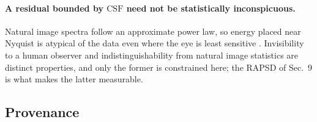 \paragraph{A residual bounded by $\mathrm{CSF}$ need not be
statistically inconspicuous.} Natural image spectra follow an
approximate power law, so energy placed near Nyquist is atypical of the
data even where the eye is least sensitive
\citep{falck2025fourier,dieleman2024spectral}. Invisibility to a human
observer and indistinguishability from natural image statistics are
distinct properties, and only the former is constrained here; the RAPSD
of Sec.~9 is what makes the latter measurable.

\subsection{Provenance}

